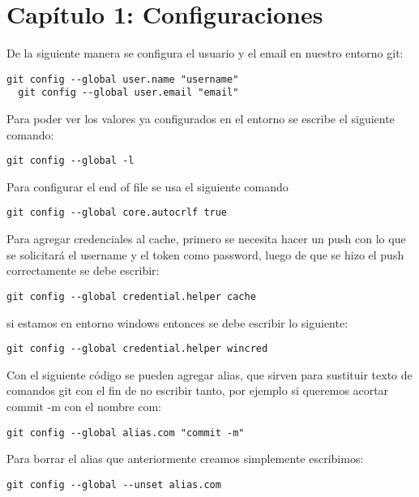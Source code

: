 \section{Capítulo 1: Configuraciones}
De la siguiente manera se configura el usuario y el email en nuestro entorno git:

\begin{lstlisting}[numbers=none]
  git config --global user.name "username"
  git config --global user.email "email"
\end{lstlisting}

Para poder ver los valores ya configurados en el entorno se escribe el siguiente comando:

\begin{lstlisting}[numbers=none]
  git config --global -l
\end{lstlisting}

Para configurar el end of file se usa el siguiente comando

\begin{lstlisting}[numbers=none]
  git config --global core.autocrlf true
\end{lstlisting}

Para agregar credenciales al cache, primero se necesita hacer un push con lo que se solicitar\'a el username y el token como password, luego de que se hizo el push correctamente se debe escribir:


\begin{lstlisting}[numbers=none]
  git config --global credential.helper cache
\end{lstlisting}

si estamos en entorno windows entonces se debe escribir lo siguiente:


\begin{lstlisting}[numbers=none]
  git config --global credential.helper wincred
\end{lstlisting}

Con el siguiente c\'odigo se pueden agregar alias, que sirven para sustituir texto de comandos git con el fin de no escribir tanto, por ejemplo si queremos acortar commit -m con el nombre com:


\begin{lstlisting}[numbers=none]
  git config --global alias.com "commit -m"
\end{lstlisting}

Para borrar el alias que anteriormente creamos simplemente escribimos:

\begin{lstlisting}[numbers=none]
  git config --global --unset alias.com
\end{lstlisting}

